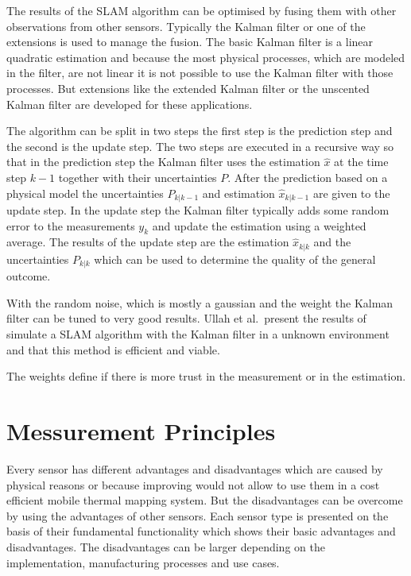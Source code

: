 The results of the SLAM algorithm can be optimised by fusing them with other observations from other sensors.
Typically the Kalman filter or one of the extensions is used to manage the fusion.
The basic Kalman filter is a linear quadratic estimation and because the most physical processes, which are modeled in the filter, are not linear it is not possible to use the Kalman filter with those processes.
But extensions like the extended Kalman filter or the unscented Kalman filter are developed for these applications.

The algorithm can be split in two steps the first step is the prediction step and the second is the update step.
The two steps are executed in a recursive way so that in the prediction step the Kalman filter uses the estimation $\hat{x}$ at the time step $k-1$ together with their uncertainties $P$.
After the prediction based on a physical model the uncertainties $P_{k|k-1}$ and estimation $\hat{x}_{k|k-1}$ are given to the update step.
In the update step the Kalman filter typically adds some random error to the measurements $y_{k}$ and update the estimation using a weighted average.
The results of the update step are  the estimation $\hat{x}_{k|k}$ and the uncertainties $P_{k|k}$ which can be used to determine the quality of the general outcome\cite{Zarchang2000}.

With the random noise, which is mostly a gaussian and the weight the Kalman filter can be tuned to very good results.
Ullah et al.~present the results of simulate a SLAM algorithm with the Kalman filter in a unknown environment and that this method is efficient and viable\cite{Ullah}.

The weights define if there is more trust in the measurement or in the estimation.

\section{Messurement Principles}\label{sec:messurementPrinciples}
Every sensor has different advantages and disadvantages which are caused by physical reasons or because improving would not allow to use them in a cost efficient mobile thermal mapping system.
But the disadvantages can be overcome by using the advantages of other sensors.
Each sensor type is presented on the basis of their fundamental functionality which shows their basic advantages and disadvantages.
The disadvantages can be larger depending on the implementation, manufacturing processes and use cases.


